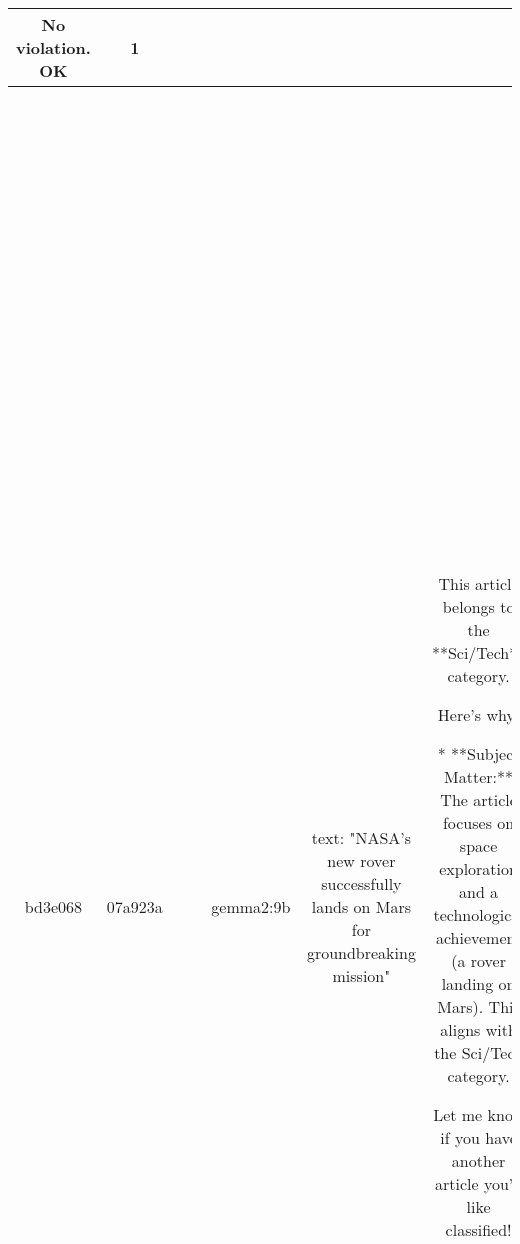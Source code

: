 \begin{table}[h!]
\begin{tabular}{|c|c|c|c|c|c|c|c|c|c|}
No violation.
OK & 1\\
\hline
bd3e068 & 07a923a &  &  & gemma2:9b & text: "NASA's new rover successfully lands on Mars for groundbreaking mission" & This article belongs to the **Sci/Tech** category. 

Here's why:

* **Subject Matter:**  The article focuses on space exploration and a technological achievement (a rover landing on Mars). This aligns with the Sci/Tech category.


Let me know if you have another article you'd like classified! 
 & ok & The chatbot output provides a classification, placing the article in the "Sci/Tech" category. This is consistent with the description's scope, stating that a news article can be classified into one of four categories, including Sci/Tech. The output gives a rationale for the classification, focusing on space exploration and technology—concepts closely associated with the Sci/Tech category as per the description. The concluding sentence offers to classify another article, which does not violate any guidelines as it does not relate to the compliance with the given description. There are no explicit elements of the output violating the given chatbot description without knowledge of the input.

OK & 1\\
\hline
edd4a4d & 07a923a &  &  & llama3.2:1b & text: "The World Bank raises forecast for global economic growth in 2023" & Based on the input text, I would classify the news article as:

World

Reasoning:

* The input text mentions a specific topic (global economic growth) and an entity (the World Bank), which aligns with the primary category of "World".
* There is no mention of sports, business, or sci/tech in this particular sentence. & ok & The chatbot output provides a classification of "World" for the input text, along with reasoning for this classification. Based on the description, the task of the chatbot is to classify the input text into one of the categories: World, Sports, Business, or Sci/Tech. The output does provide a classification that aligns with one of these categories. The reasoning includes details about the input text mentioning topics and entities that align with the "World" category. The output complies with the requirements to classify the input text and provide reasoning.

No violation.
OK & 1\\
\hline
edd4a4d & 07a923a &  &  & gpt-4o-mini & text: "The World Bank raises forecast for global economic growth in 2023" & Business: "The World Bank raises forecast for global economic growth in 2023" & ok & No violation. The output provided classifies the news article into the category "Business," which is one of the specified categories (World, Sports, Business, Sci/Tech) mentioned in the chatbot description. The format follows the example pattern given, classifying the news article with the category name followed by the article in quotation marks.


\end{tabular}
\end{table}
